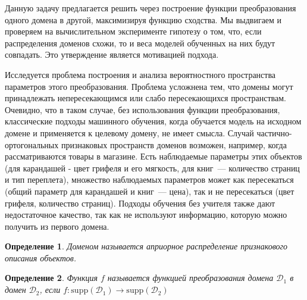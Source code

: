 \documentclass[12pt]{extarticle}
\newtheorem{definition}{Определение}
\newcommand{\Domain}{\mathcal{D}}
\newcommand{\supp}{\mathrm{supp}}
\begin{document}
Данную задачу предлагается решить через построение функции преобразования одного домена в другой, максимизируя функцию сходства. Мы выдвигаем и проверяем на вычислительном эксперименте гипотезу о том, что, если распределения доменов схожи, то и веса моделей обученных на них будут совпадать. Это утверждение является мотивацией подхода.

Исследуется проблема построения и анализа вероятностного пространства параметров этого преобразования. Проблема усложнена тем, что домены могут принадлежать непересекающимся или слабо пересекающихся пространствам. Очевидно, что в таком случае, без использования функции преобразования, классические подходы машинного обучения, когда обучается модель на исходном домене и применяется к целевому домену, не имеет смысла. Случай частично-ортогональных признаковых пространств доменов возможен, например, когда рассматриваются товары в магазине. Есть наблюдаемые параметры этих объектов (для карандашей - цвет грифеля и его мягкость, для книг~--- количество страниц и тип переплета), множество наблюдаемых параметров может как пересекаться (общий параметр для карандашей и книг~--- цена), так и не пересекаться (цвет грифеля, количество страниц). Подходы обучения без учителя также дают недостаточное качество, так как не используют информацию, которую можно получить из первого домена.

    
\begin{definition}
Доменом называется априорное распределение признакового описания объектов.
\end{definition}

\begin{definition}
Функция $f$ называется функцией преобразования домена $\Domain_1$ в домен $\Domain_2$, если $f: \supp(\Domain_1) \to \supp(\Domain_2)$
\end{definition}
\end{document}
